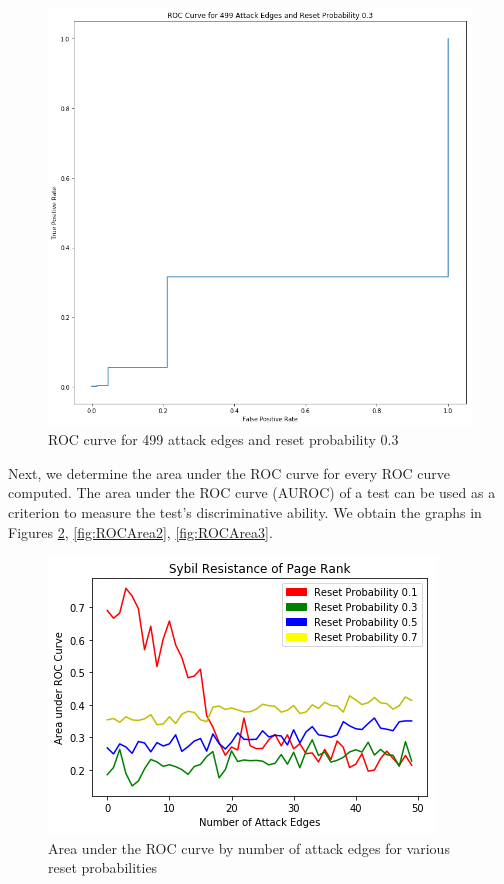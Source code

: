 \documentclass[sigconf]{acmart}
\theoremstyle{definition}
\begin{document}
\begin{figure}
\includegraphics[scale=0.3]{ROCCurve3}
\caption{ROC curve for 499 attack edges and reset probability 0.3}
\label{fig:ROCCurve3}
\end{figure}

\noindent Next, we determine the area under the ROC curve for every ROC curve computed. The area under the ROC curve (AUROC) of a test can be used as a criterion to measure the test's discriminative ability. We obtain the graphs in Figures \ref{fig:ROCArea1}, \ref{fig:ROCArea2}, \ref{fig:ROCArea3}.

\begin{figure}
\includegraphics[scale=0.6]{ROCArea1}
\caption{Area under the ROC curve by number of attack edges for various reset probabilities}
\label{fig:ROCArea1}
\end{figure}
\end{document}
